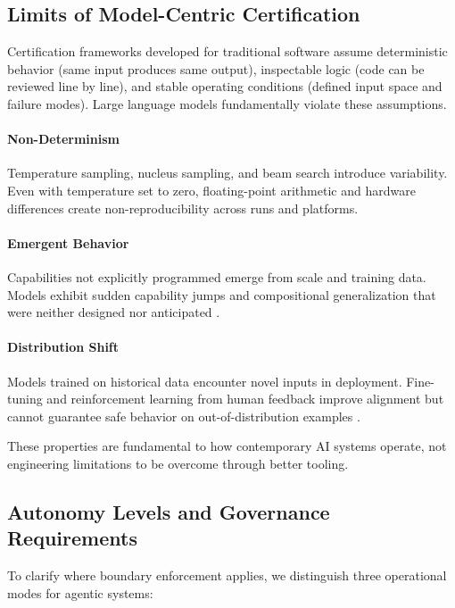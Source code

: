 \documentclass[sigconf,nonacm]{acmart}
\begin{document}
\subsection{Limits of Model-Centric Certification}

Certification frameworks developed for traditional software assume deterministic behavior (same input produces same output), inspectable logic (code can be reviewed line by line), and stable operating conditions (defined input space and failure modes). Large language models fundamentally violate these assumptions.

\paragraph{Non-Determinism} Temperature sampling, nucleus sampling, and beam search introduce variability. Even with temperature set to zero, floating-point arithmetic and hardware differences create non-reproducibility across runs and platforms.

\paragraph{Emergent Behavior} Capabilities not explicitly programmed emerge from scale and training data. Models exhibit sudden capability jumps and compositional generalization that were neither designed nor anticipated \cite{wei2022emergent}.

\paragraph{Distribution Shift} Models trained on historical data encounter novel inputs in deployment. Fine-tuning and reinforcement learning from human feedback improve alignment but cannot guarantee safe behavior on out-of-distribution examples \cite{casper2023open}.

These properties are fundamental to how contemporary AI systems operate, not engineering limitations to be overcome through better tooling.

\subsection{Autonomy Levels and Governance Requirements}

To clarify where boundary enforcement applies, we distinguish three operational modes for agentic systems:
\end{document}
